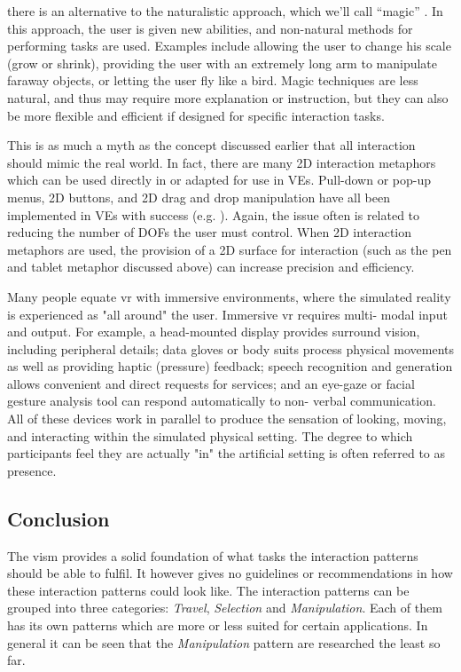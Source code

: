 there is an alternative to the naturalistic approach, which we’ll call “magic” \citep{Smith1987}. In this approach, the user is given new abilities, and non-natural methods for performing tasks are used. Examples include allowing the user to change his scale (grow or shrink), providing the user with an extremely long arm to manipulate faraway objects, or letting the user fly like a bird. Magic techniques are less natural, and thus may require more explanation or instruction, but they can also be more flexible and efficient if designed for specific interaction tasks. \cite{Bowman2002}

This is as much a myth as the concept discussed earlier that all interaction should mimic the real world. In fact, there are many 2D interaction metaphors which can be used directly in or adapted for use in VEs. Pull-down or pop-up menus, 2D buttons, and 2D drag and drop manipulation have all been implemented in VEs with success (e.g. \cite{Bowman1998}). Again, the issue often is related to reducing the number of DOFs the user must control. When 2D interaction metaphors are used, the provision of a 2D surface for interaction (such as the pen and tablet metaphor discussed above) can increase precision and efficiency.  \cite{Bowman2002}

Many people equate \gls{vr} with immersive environments, where the simulated reality is experienced as "all around" the user. Immersive \gls{vr} requires multi- modal input and output. For example, a head-mounted display provides surround vision, including peripheral details; data gloves or body suits process physical movements as well as providing haptic (pressure) feedback; speech recognition and generation allows convenient and direct requests for services; and an eye-gaze or facial gesture analysis tool can respond automatically to non- verbal communication. All of these devices work in parallel to produce the sensation of looking, moving, and interacting within the simulated physical setting. The degree to which participants feel they are actually "in" the artificial setting is often referred to as presence. \cite{Rosson2002}




\subsection{Conclusion}

The \gls{vism} provides a solid foundation of what tasks the interaction patterns should be able to fulfil. It however gives no guidelines or recommendations in how these interaction patterns could look like. The interaction patterns can be grouped into three categories: \textit{Travel}, \textit{Selection} and \textit{Manipulation}. Each of them has its own patterns which are more or less suited for certain applications. In general it can be seen that the \textit{Manipulation} pattern are researched the least so far.

